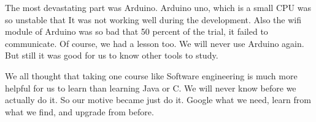 \documentclass[conference]{IEEEtran}
\begin{document}
 The most devastating part was Arduino. Arduino uno, which is a small CPU was so unstable that It was not working well during the development. Also the wifi module of Arduino was so bad that 50 percent of the trial, it failed to communicate. Of course, we had a lesson too. We will never use Arduino again. But still it was good for us to know other tools to study. 
 
 We all thought that taking one course like Software engineering is much more helpful for us to learn than learning Java or C. We will never know before we actually do it. So our motive became just do it. Google what we need, learn from what we find, and upgrade from before. 
 
 






%
%

\end{document}
